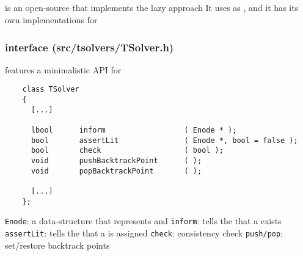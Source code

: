 \subsection{\opensmt}

\begin{frame}
  \frametitle{\opensmt}

  \opensmt is an open-source \smtsolver that implements the lazy approach
  \vfill
  It uses  as \satsolver, and it has its own implementations for
  \tsolvers 
  \vfill
  \pause
  \begin{center}
  \scalebox{.35}{}
  \end{center}

\end{frame}

\begin{frame}[fragile]
  \frametitle{\tsolver interface (src/tsolvers/TSolver.h)}

  \scriptsize

  \opensmt features a minimalistic API for \tsolvers
  \vfill
  \begin{verbatim}
    class TSolver
    {
      [...]

      lbool      inform                  ( Enode * );
      bool       assertLit               ( Enode *, bool = false );
      bool       check                   ( bool );
      void       pushBacktrackPoint      ( );
      void       popBacktrackPoint       ( );

      [...]
    };
  \end{verbatim}
  \vfill
  \verb|Enode|: a data-structure that represents \formulae and \tatoms 
  \vfill
  \verb|inform|: tells the \tsolver that a \tatom exists
  \vfill
  \verb|assertLit|: tells the \tsolver that a \tatom is assigned
  \vfill
  \verb|check|: consistency check
  \vfill
  \verb|push/pop|: set/restore backtrack points

\end{frame}

